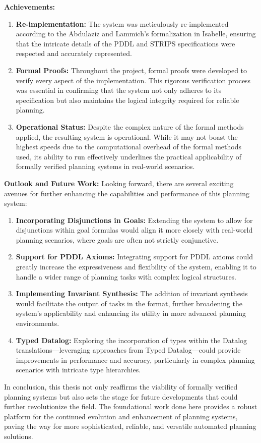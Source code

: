 \textbf{Achievements:} \begin{enumerate} \item \textbf{Re-implementation:} The system was meticulously re-implemented according to the Abdulaziz and Lammich's formalization in Isabelle, ensuring that the intricate details of the PDDL and STRIPS specifications were respected and accurately represented. \item \textbf{Formal Proofs:} Throughout the project, formal proofs were developed to verify every aspect of the implementation. This rigorous verification process was essential in confirming that the system not only adheres to its specification but also maintains the logical integrity required for reliable planning. \item \textbf{Operational Status:} Despite the complex nature of the formal methods applied, the resulting system is operational. While it may not boast the highest speeds due to the computational overhead of the formal methods used, its ability to run effectively underlines the practical applicability of formally verified planning systems in real-world scenarios. \end{enumerate}

\textbf{Outlook and Future Work:} Looking forward, there are several exciting avenues for further enhancing the capabilities and performance of this planning system:

\begin{enumerate} \item \textbf{Incorporating Disjunctions in Goals:} Extending the system to allow for disjunctions within goal formulas would align it more closely with real-world planning scenarios, where goals are often not strictly conjunctive. \item \textbf{Support for PDDL Axioms:} Integrating support for PDDL axioms could greatly increase the expressiveness and flexibility of the system, enabling it to handle a wider range of planning tasks with complex logical structures. \item \textbf{Implementing Invariant Synthesis:} The addition of invariant synthesis would facilitate the output of tasks in the \SASP{} format, further broadening the system’s applicability and enhancing its utility in more advanced planning environments. \item \textbf{Typed Datalog:} Exploring the incorporation of types within the Datalog translations—leveraging approaches from Typed Datalog—could provide improvements in performance and accuracy, particularly in complex planning scenarios with intricate type hierarchies. \end{enumerate}

In conclusion, this thesis not only reaffirms the viability of formally verified planning systems but also sets the stage for future developments that could further revolutionize the field. The foundational work done here provides a robust platform for the continued evolution and enhancement of planning systems, paving the way for more sophisticated, reliable, and versatile automated planning solutions.